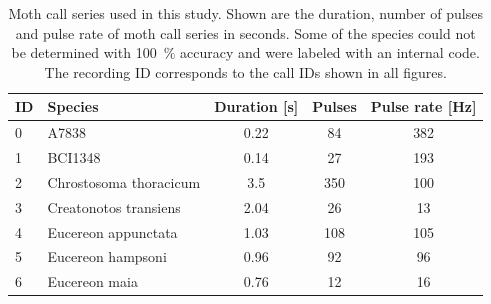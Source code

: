 \documentclass[12pt,a4paper,pdftex]{article}
\newcommand{\percent}[1]{#1~$\%$}
\begin{document}
\begin{table}[p]
	\centering
	\caption{Moth call series used in this study. Shown are the duration, number of pulses and pulse rate of moth call series in seconds. Some of the species could not be determined with \percent{100} accuracy and were labeled with an internal code. The recording ID corresponds to the call IDs shown in all figures.}
	\setlength{\tabcolsep}{10pt} %
	\renewcommand{\arraystretch}{1.5} %
	\label{tab:CS}
\begin{tabular}{llccc}
	\rowcolor[HTML]{EFEFEF} 
	ID & {\color[HTML]{000000} Species} & \multicolumn{1}{l}{\cellcolor[HTML]{EFEFEF}Duration {[}s{]}} & \multicolumn{1}{l}{\cellcolor[HTML]{EFEFEF}Pulses} & \multicolumn{1}{l}{\cellcolor[HTML]{EFEFEF}Pulse rate {[}Hz{]}} \\ \hline
	0  & A7838                          & 0.22                                                         & 84                                                 & 382                                                             \\
	1  & BCI1348                        & 0.14                                                         & 27                                                 & 193                                                             \\
	2  & Chrostosoma thoracicum         & 3.5                                                          & 350                                                & 100                                                             \\
	3  & Creatonotos transiens          & 2.04                                                         & 26                                                 & 13                                                              \\
	4  & Eucereon appunctata            & 1.03                                                         & 108                                                & 105                                                             \\
	5  & Eucereon hampsoni              & 0.96                                                         & 92                                                 & 96                                                              \\
	6  & Eucereon maia                  & 0.76                                                         & 12                                                 & 16                                                              \\

\end{tabular}
\end{table}
\end{document}
